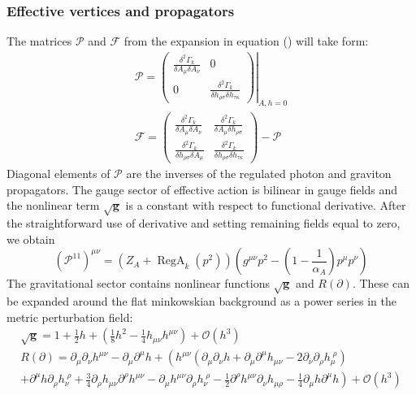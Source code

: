\documentclass[11pt, a4paper]{article}
\begin{document}
\subsubsection{Effective vertices and propagators}
The matrices $\mathcal{P}$ and $\mathcal{F}$ from the expansion in equation () will take form:
\begin{gather}
    \mathcal{P} = 
    \left. \begin{pmatrix}
    \frac{\delta^2 \Gamma_k}{\delta A_\mu \delta A_\nu}& 0\\
    0 & \frac{\delta^2 \Gamma_k}{\delta h_{\rho\sigma} \delta h_{\tau\kappa}}
    \end{pmatrix} \right|_{A,h=0} \\
    \mathcal{F} = 
    \begin{pmatrix}
        \frac{\delta^2 \Gamma_k}{\delta A_\mu \delta A_\nu}& \frac{\delta^2 \Gamma_k}{\delta A_\mu \delta h_{\rho\sigma}}\\
        \frac{\delta^2 \Gamma_k}{\delta h_{\rho\sigma} \delta A_\mu} & \frac{\delta^2 \Gamma_k}{\delta h_{\rho\sigma} \delta h_{\tau\kappa}}
    \end{pmatrix} - \mathcal{P}
\end{gather}
Diagonal elements of $\mathcal{P}$ are the inverses of the regulated photon and graviton propagators.
The gauge sector of effective action is bilinear in gauge fields and the nonlinear term $\sqrt{\mathbf{g}}$ is
a constant with respect to functional derivative. After the straightforward use of derivative and setting
remaining fields equal to zero, we obtain
\begin{equation}
    \left(\mathcal{P}^{1 1}\right)^{\mu\nu} = \left(Z_{A} + \operatorname{RegA}_k(p^2)\right) \left( g^{\mu\nu} p^2 - \left(1 - \frac{1}{\alpha_A}\right) p^\mu p^\nu \right)
\end{equation}
The gravitational sector contains nonlinear functions $\sqrt{\mathbf{g}}$ and $R(\partial)$.
These can be expanded around the flat minkowskian background as a power series in the metric perturbation field:
\begin{gather}
    \sqrt{\mathbf{g}} = 1 +  \frac{1}{2} h + \left( \frac{1}{8} h^2 - \frac{1}{4} h_{\mu\nu} h^{\mu\nu} \right) + \mathcal{O}(h^3) \\
    R(\partial) = \partial_\mu \partial_\nu h^{\mu\nu} - \partial_\mu \partial^\mu h + \left( h^{\mu\nu} \left(\partial_\mu \partial_\nu h + \partial_\mu \partial^\mu h_{\mu\nu} - 2 \partial_\nu \partial_\rho h_\mu^{\; \rho} \right) \phantom{\frac{1}{2}} \right. \\
    +  \left. \partial^\mu h \partial_\rho h_\nu^{\; \rho} + \frac{3}{4} \partial_\rho h_{\mu\nu} \partial^\rho h^{\mu\nu} - \partial_\mu h^{\mu\nu} \partial_\rho h_\nu^{\;\rho} - \frac{1}{2} \partial^\rho h^{\mu\nu} \partial_\nu h_{\mu\rho} - \frac{1}{4} \partial_\mu h \partial^\mu h \right) + \mathcal{O}(h^3)
\end{gather}
\end{document}

